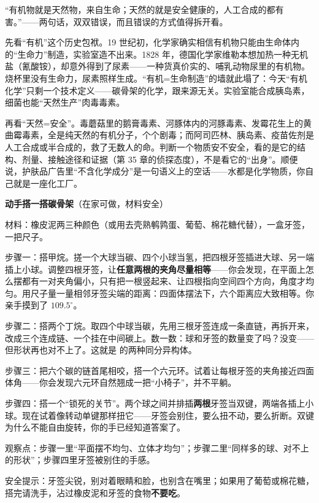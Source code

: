 \begin{wuqu}
“有机物就是天然物，来自生命；天然的就是安全健康的，人工合成的都有害。”——两句话，双双错误，而且错误的方式值得拆开看。

先看“有机”这个历史包袱。19 世纪初，化学家确实相信有机物只能由生命体内的“生命力”制造，实验室造不出来。1828 年，德国化学家维勒本想加热一种无机盐（氰酸铵），却意外得到了尿素——一种货真价实的、哺乳动物尿里的有机物。烧杯里没有生命力，尿素照样生成。“有机=生命制造”的墙就此塌了：今天“有机化学”只剩一个技术定义——碳骨架的化学，跟来源无关。实验室能合成胰岛素，细菌也能“天然生产”肉毒毒素。

再看“天然=安全”。毒蘑菇里的鹅膏毒素、河豚体内的河豚毒素、发霉花生上的黄曲霉毒素，全是纯天然的有机分子，个个剧毒；而阿司匹林、胰岛素、疫苗佐剂是人工合成或半合成的，救了无数人的命。判断一个物质安不安全，看的是它的结构、剂量、接触途径和证据（第 35 章的侦探态度），不是看它的“出身”。顺便说，护肤品广告里“不含化学成分”是一句语义上的空话——水都是化学物质，你自己就是一座化工厂。
\end{wuqu}

\begin{shiyan}
\textbf{动手搭一搭碳骨架}（在家可做，材料安全）

材料：橡皮泥两三种颜色（或用去壳熟鹌鹑蛋、葡萄、棉花糖代替），一盒牙签，一把尺子。

步骤一：搭甲烷。搓一个大球当碳、四个小球当氢，把四根牙签插进大球、另一端插上小球。调整四根牙签，让\textbf{任意两根的夹角尽量相等}——你会发现，在平面上怎么摆都有一对夹角偏小，只有把一根竖起来、让四根指向空间四个方向，角度才均匀。用尺子量一量相邻牙签尖端的距离：四面体摆法下，六个距离应大致相等。你亲手摸到了 $109.5^{\circ}$。

步骤二：搭两个丁烷。取四个中球当碳，先用三根牙签连成一条直链，再拆开来，改成三个连成链、一个挂在中间碳上。数一数：球和牙签的数量变了吗？没变——但形状再也对不上了。这就是  的两种同分异构体。

步骤三：把六个碳的链首尾相咬，搭一个六元环。试着让每根牙签的夹角接近四面体角——你会发现六元环自然翘成一把“小椅子”，并不平躺。

步骤四：搭一个“锁死的关节”。两个球之间并排插\textbf{两根}牙签当双键，两端各插上小球。现在试着像转动单键那样扭它——牙签会别住，要么扭不动，要么折断。双键为什么不能自由旋转，你的手已经知道答案了。

观察点：步骤一里“平面摆不均匀、立体才均匀”；步骤二里“同样多的球、对不上的形状”；步骤四里牙签被别住的手感。

安全提示：牙签尖锐，别对着眼睛和脸，也别含在嘴里；如果用了葡萄或棉花糖，搭完请洗手，沾过橡皮泥和牙签的食物\textbf{不要吃}。
\end{shiyan}

